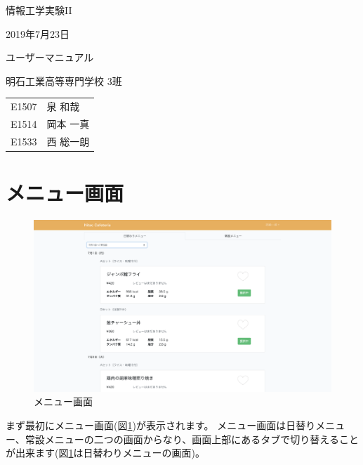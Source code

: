 \documentclass[a4paper]{ltjsarticle}
\begin{document}

\large
\vspace{-5.0cm}
\hspace{-1.0cm}
情報工学実験II

\hspace{-1.0cm}
2019年7月23日

\Huge
\vspace{1.0cm}
\begin{center}
    ユーザーマニュアル
\end{center}

\vspace{0.5cm}
\begin{center}
    \LARGE
    明石工業高等専門学校 3班
\end{center}

\LARGE
\begin{center}
    \begin{tabular}{rl}
        E1507 & 泉 和哉 \\
        E1514 & 岡本 一真 \\
        E1533 & 西 総一朗
    \end{tabular}
\end{center}

\normalsize

\tableofcontents
\thispagestyle{empty}
\clearpage
\setcounter{page}{1}


\section{メニュー画面}
    \begin{figure}[htbp]
        \centering
        \caption{メニュー画面}
        \label{top_menu}
        \includegraphics[width=1\textwidth]{image/top_menu.png}
    \end{figure}
    まず最初にメニュー画面(図\ref{top_menu})が表示されます。
    メニュー画面は日替りメニュー、常設メニューの二つの画面からなり、画面上部にあるタブで切り替えることが出来ます(図\ref{top_menu}は日替わりメニューの画面)。
\end{document}
